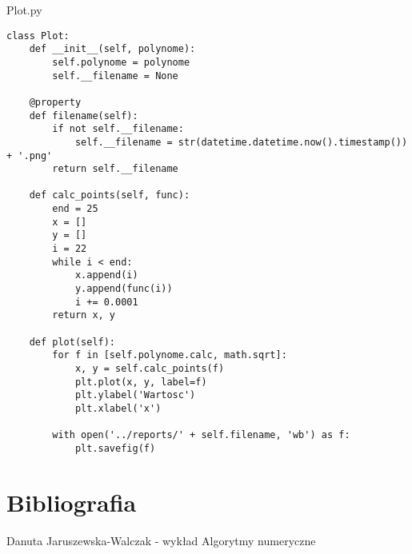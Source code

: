 \documentclass[12pt]{article}
\begin{document}
Plot.py
\begin{lstlisting}[frame=single]
class Plot:
    def __init__(self, polynome):
        self.polynome = polynome
        self.__filename = None

    @property
    def filename(self):
        if not self.__filename:
            self.__filename = str(datetime.datetime.now().timestamp()) + '.png'
        return self.__filename

    def calc_points(self, func):
        end = 25
        x = []
        y = []
        i = 22
        while i < end:
            x.append(i)
            y.append(func(i))
            i += 0.0001
        return x, y

    def plot(self):
        for f in [self.polynome.calc, math.sqrt]:
            x, y = self.calc_points(f)
            plt.plot(x, y, label=f)
            plt.ylabel('Wartosc')
            plt.xlabel('x')

        with open('../reports/' + self.filename, 'wb') as f:
            plt.savefig(f)
\end{lstlisting}

\section*{Bibliografia}
Danuta Jaruszewska-Walczak - wykład Algorytmy numeryczne
\end{document}
